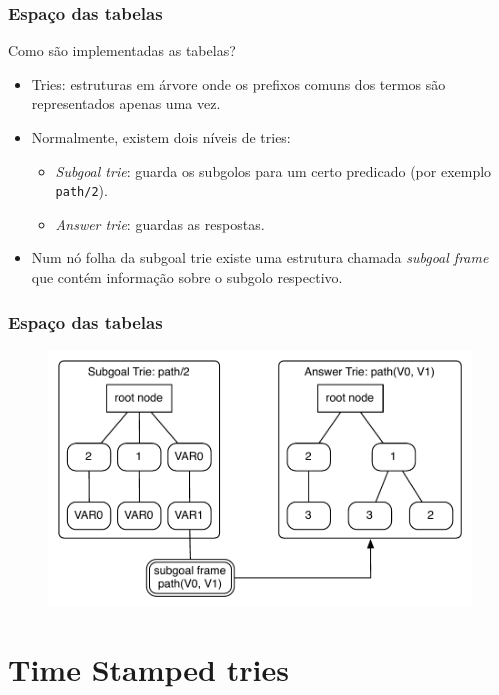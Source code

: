 \documentclass{beamer}
\begin{document}
\begin{frame}
   \frametitle{Espaço das tabelas}
   Como são implementadas as tabelas?
   \begin{itemize}
      \item Tries: estruturas em árvore onde os prefixos comuns dos termos são representados apenas uma vez.
      \pause
      \item Normalmente, existem dois níveis de tries:
         \begin{itemize}
            \item \emph{Subgoal trie}: guarda os subgolos para um certo predicado (por exemplo \texttt{path/2}).
            \item \emph{Answer trie}: guardas as respostas.
         \end{itemize}
      \pause
      \item Num nó folha da subgoal trie existe uma estrutura chamada \emph{subgoal frame} que contém informação sobre o subgolo respectivo.
   \end{itemize}
\end{frame}

\begin{frame}
  \frametitle{Espaço das tabelas}
  \begin{example}
  \begin{figure}[ht]
     \centering
       \includegraphics[scale=0.6]{two_level_tries.pdf}
   \end{figure}
 \end{example}
\end{frame}

\section{Time Stamped tries}
\end{document}
